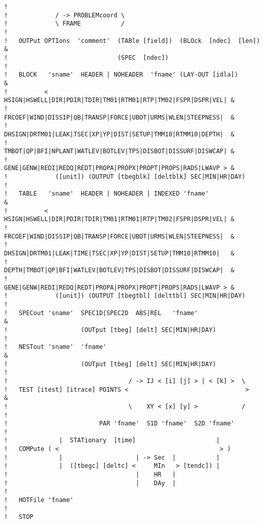 \documentclass[12pt]{book}
\begin{document}
\begin{verbatim}
!
!             / -> PROBLEMcoord \
!             \ FRAME           /
!
!   OUTPut OPTIons  'comment'  (TABle [field])  (BLOck  [ndec]  [len])      &
!                              (SPEC  [ndec])
!
!   BLOCK   'sname'  HEADER | NOHEADER  'fname' (LAY-OUT [idla])            &
!          <  HSIGN|HSWELL|DIR|PDIR|TDIR|TM01|RTM01|RTP|TM02|FSPR|DSPR|VEL| &
!             FRCOEF|WIND|DISSIP|QB|TRANSP|FORCE|UBOT|URMS|WLEN|STEEPNESS|  &
!             DHSIGN|DRTM01|LEAK|TSEC|XP|YP|DIST|SETUP|TMM10|RTMM10|DEPTH|  &
!             TMBOT|QP|BFI|NPLANT|WATLEV|BOTLEV|TPS|DISBOT|DISSURF|DISWCAP| &
!             GENE|GENW|REDI|REDQ|REDT|PROPA|PROPX|PROPT|PROPS|RADS|LWAVP > &
!             ([unit]) (OUTPUT [tbegblk] [deltblk] SEC|MIN|HR|DAY)
!
!   TABLE   'sname'  HEADER | NOHEADER | INDEXED 'fname'                    &
!          <  HSIGN|HSWELL|DIR|PDIR|TDIR|TM01|RTM01|RTP|TM02|FSPR|DSPR|VEL| &
!             FRCOEF|WIND|DISSIP|QB|TRANSP|FORCE|UBOT|URMS|WLEN|STEEPNESS|  &
!             DHSIGN|DRTM01|LEAK|TIME|TSEC|XP|YP|DIST|SETUP|TMM10|RTMM10|   &
!             DEPTH|TMBOT|QP|BFI|WATLEV|BOTLEV|TPS|DISBOT|DISSURF|DISWCAP|  &
!             GENE|GENW|REDI|REDQ|REDT|PROPA|PROPX|PROPT|PROPS|RADS|LWAVP > &
!             ([unit]) (OUTPUT [tbegtbl] [delttbl] SEC|MIN|HR|DAY)
!
!   SPECout 'sname'  SPEC1D|SPEC2D  ABS|REL   'fname'                       &
!                    (OUTput [tbeg] [delt] SEC|MIN|HR|DAY)
!
!   NESTout 'sname'  'fname'                                                &
!                    (OUTput [tbeg] [delt] SEC|MIN|HR|DAY)
!
!                                 / -> IJ < [i] [j] > | < [k] >  \
!   TEST [itest] [itrace] POINTS <                                >         &
!                                 \    XY < [x] [y] >            /
!
!                         PAR 'fname'  S1D 'fname'  S2D 'fname'
!
!              |  STATionary  [time]                      |
!   COMPute ( <                                            > )
!              |                    | -> Sec  |           |
!              |  ([tbegc] [deltc] <     MIn   > [tendc]) |
!                                   |    HR   |
!                                   |    DAy  |
!
!   HOTFile 'fname'
!
!   STOP
\end{verbatim}

 \label{app:spcform}
\end{document}
